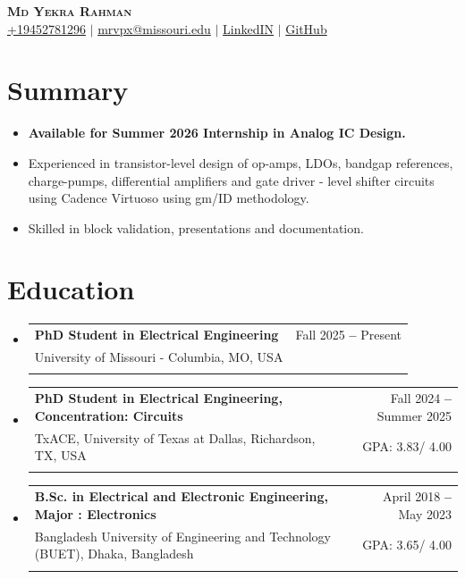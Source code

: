 \documentclass[letterpaper,11pt]{article}
\makeatletter
\newcommand{\resumeItem}[1]{
  \item\small{
    {#1 \vspace{-3pt}}
  }
}
\newcommand{\resumeEducationHeading}[6]{
  \vspace{-3pt}\item
    \begin{tabular*}{0.97\textwidth}[t]{l@{\extracolsep{\fill}}r}
      \textbf{#1} & #2 \\
      \small#3 & \small #4 \\
      \small#5 & \small #6 \\
    \end{tabular*}\vspace{-3pt}
}
\newcommand{\resumeSubHeadingListStart}{\begin{itemize}[leftmargin=0.15in, label={}]}
\newcommand{\resumeSubHeadingListEnd}{\end{itemize}}
\newcommand{\resumeItemListStart}{\begin{itemize}}
\newcommand{\resumeItemListEnd}{\end{itemize}\vspace{-3pt}}
\makeatother
\begin{document}

\begin{center}
    \textbf{\Huge \scshape Md Yekra Rahman} \\ \vspace{3pt}
    \small
    \faMobile \hspace{.5pt} \href{tel:+19452781296}{+19452781296}
    $|$
    \faAt \hspace{.5pt} \href{mailto:mrvpx@missouri.edu}{mrvpx@missouri.edu}
    $|$
    \faLinkedinSquare \hspace{.5pt} \href{https://www.linkedin.com/in/mdyekrarahman/}{LinkedIN}
    $|$
    \faGithub \hspace{.5pt} \href{https://github.com/MdYekraRahman}{GitHub}
   
\end{center}

 \vspace{-20pt}
\section{Summary}
 \vspace{-5pt}
\resumeItemListStart \resumeItem {\textbf{Available for Summer 2026 Internship in Analog IC Design.}} 
  \vspace{-5pt}
\resumeItem{Experienced in transistor-level design of op-amps, LDOs, bandgap references, charge-pumps, differential amplifiers and gate driver - level shifter circuits using Cadence Virtuoso using gm/ID methodology.}  
 \vspace{-5pt}
 \resumeItem{ Skilled in block validation, presentations and documentation.} 
\vspace{-5pt}
 
\vspace{-10pt}\resumeItemListEnd

\section{Education}
  \vspace{-3pt}
  \resumeSubHeadingListStart
    \resumeEducationHeading
      {PhD Student in Electrical Engineering
      }{Fall 2025 \textbf{--} Present}
      {University of Missouri - Columbia, MO, USA}{}
      {}{}
      \vspace{-20pt}
          \resumeEducationHeading
      {PhD Student in Electrical Engineering, Concentration: Circuits
      }{Fall 2024 \textbf{--} Summer 2025}
      {TxACE, University of Texas at Dallas, Richardson, TX, USA}{GPA: 3.83/ 4.00}
      {}{}
        \vspace{-20pt}
 \resumeEducationHeading
            {B.Sc. in Electrical and Electronic Engineering, Major : Electronics }{April 2018 \textbf{--} May 2023}
      {Bangladesh University of Engineering and Technology (BUET), Dhaka, Bangladesh}{GPA: 3.65/ 4.00}
      {}{}
    \resumeSubHeadingListEnd
  \vspace{-30pt}
\end{document}
